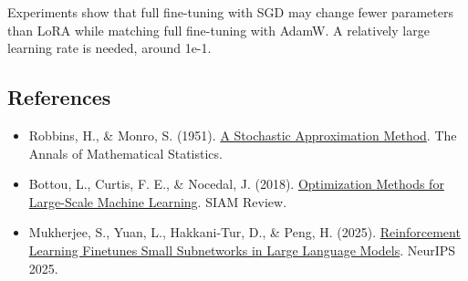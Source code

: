Experiments show that full fine-tuning with SGD may change fewer parameters than LoRA while matching full fine-tuning with AdamW. A relatively large learning rate is needed, around 1e-1.

\FloatBarrier
{}
\hypertarget{references-25}{%
\subsection{References}\label{references-25}}

\vspace{0.25em}
\begin{itemize}
\tightlist
\item
  Robbins, H., \& Monro, S. (1951). \href{https://doi.org/10.1214/aoms/1177729586}{A Stochastic Approximation Method}. The Annals of Mathematical Statistics.
\item
  Bottou, L., Curtis, F. E., \& Nocedal, J. (2018). \href{https://epubs.siam.org/doi/10.1137/16M1080173}{Optimization Methods for Large-Scale Machine Learning}. SIAM Review.
\item
  Mukherjee, S., Yuan, L., Hakkani-Tur, D., \& Peng, H. (2025). \href{https://arxiv.org/abs/2505.11711}{Reinforcement Learning Finetunes Small Subnetworks in Large Language Models}. NeurIPS 2025.
\end{itemize}

\clearpage

